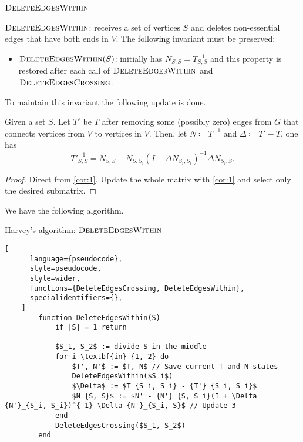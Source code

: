 \subsection{\(\textsc{DeleteEdgesWithin}\)}

\(\textsc{DeleteEdgesWithin}\): receives a set of vertices \(S\) and deletes non-essential edges that have both ends in \(V\).
The following invariant must be preserved:
\begin{itemize}
    \item \(\textsc{DeleteEdgesWithin}(S)\): initially has \(N_{S, S} = T^{-1}_{S, S}\) and this property is restored after each call of \(\textsc{DeleteEdgesWithin}\)
    and \(\textsc{DeleteEdgesCrossing}\).
\end{itemize}
To maintain this invariant the following update is done.
\begin{theorem}[Update 3]
    Given a set \(S\). Let \(T'\) be \(T\) after removing some (possibly zero) edges from \(G\) that connects vertices from \(V\) to vertices in \(V\).
    Then, let \(N \coloneqq T^{-1}\) and \(\Delta \coloneqq T' - T\), one has
    \[
        {T'}^{-1}_{S, S} = N_{S, S} - N_{S, S_i}(I + \Delta N_{S_i, S_i})^{-1} \Delta N_{S_i, S}.
    \]
\end{theorem}

\begin{proof}
    Direct from \ref{cor:1}. Update the whole matrix with \ref{cor:1} and select only the desired submatrix.
\end{proof}

We have the following algorithm.

\begin{programruledcaption}{Harvey's algorithm: \(\textsc{DeleteEdgesWithin}\)}
    \begin{lstlisting}[
      language={pseudocode},
      style=pseudocode,
      style=wider,
      functions={DeleteEdgesCrossing, DeleteEdgesWithin},
      specialidentifiers={},
    ]
        function DeleteEdgesWithin(S)
            if |S| = 1 return

            $S_1, S_2$ := divide S in the middle
            for i \textbf{in} {1, 2} do
                $T', N'$ := $T, N$ // Save current T and N states
                DeleteEdgesWithin($S_i$)
                $\Delta$ := $T_{S_i, S_i} - {T'}_{S_i, S_i}$
                $N_{S, S}$ := $N' - {N'}_{S, S_i}(I + \Delta {N'}_{S_i, S_i})^{-1} \Delta {N'}_{S_i, S}$ // Update 3
            end
            DeleteEdgesCrossing($S_1, S_2$)
        end
    \end{lstlisting}
\end{programruledcaption}

